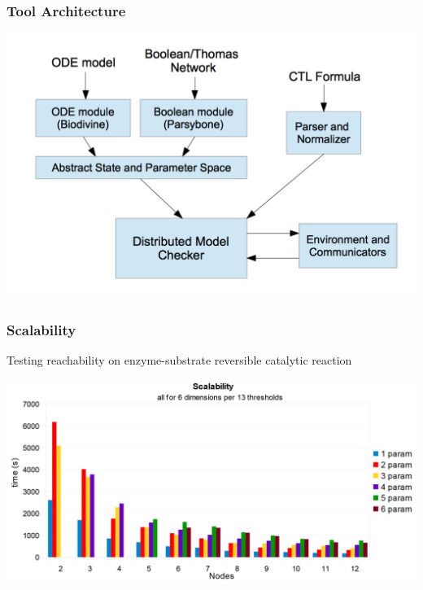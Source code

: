 \documentclass{beamer}
\begin{document}
  \begin{frame}
  	\frametitle{Tool Architecture}
  	\begin{center}
		\includegraphics[scale=.55]{architecture.png}  	
  	\end{center}
  \end{frame}
  \begin{frame}
  	\frametitle{Scalability}
  	Testing reachability on enzyme-substrate reversible catalytic reaction
  	\begin{center}
	 \includegraphics[scale=0.18]{time_series_plot.png}  	
  	\end{center}
  \end{frame}
\end{document}
